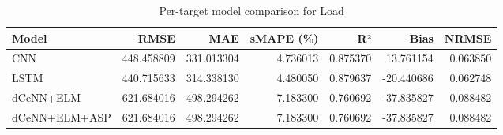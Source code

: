 \begin{table}
\caption{Per-target model comparison for Load}
\begin{tabular}{lrrrrrr}
\toprule
Model & RMSE & MAE & sMAPE (\%) & R² & Bias & NRMSE \\
\midrule
CNN & 448.458809 & 331.013304 & 4.736013 & 0.875370 & 13.761154 & 0.063850 \\
LSTM & 440.715633 & 314.338130 & 4.480050 & 0.879637 & -20.440686 & 0.062748 \\
dCeNN+ELM & 621.684016 & 498.294262 & 7.183300 & 0.760692 & -37.835827 & 0.088482 \\
dCeNN+ELM+ASP & 621.684016 & 498.294262 & 7.183300 & 0.760692 & -37.835827 & 0.088482 \\
\bottomrule
\end{tabular}
\end{table}
